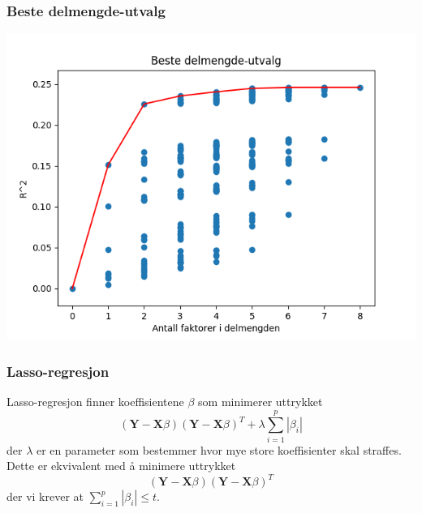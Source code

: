 \documentclass[aspectratio=169]{beamer}
\begin{document}
\begin{frame}
  \frametitle{Beste delmengde-utvalg}
  \begin{center}
    \includegraphics[height=0.8\textheight]{best_subset.png}
  \end{center}
\end{frame}

\begin{frame}
  \frametitle{Lasso-regresjon}
  Lasso-regresjon finner koeffisientene \(\beta\) som minimerer uttrykket
  \begin{equation}
    (\textbf{Y} - \textbf{X}\beta)(\textbf{Y} - \textbf{X}\beta)^T + \lambda \sum_{i=1}^p |\beta_i|
  \end{equation}
  der \(\lambda\) er en parameter som bestemmer hvor mye store koeffisienter skal straffes. Dette er ekvivalent med å minimere uttrykket
  \begin{equation}
    (\textbf{Y} - \textbf{X}\beta)(\textbf{Y} - \textbf{X}\beta)^T
  \end{equation}
  der vi krever at \(\sum_{i=1}^p |\beta_i| \leq t\).
\end{frame}
\end{document}
